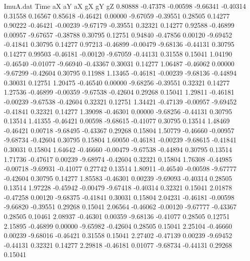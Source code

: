 \begin{filecontents}{ImuA.dat}
Time aX aY aX gX gY gZ
   0.80888   -0.47378   -0.00598   -9.66341   -0.40314    0.31558    0.16567
   0.85618   -0.46421    0.00000   -9.67059   -0.39551    0.28505    0.14277
   0.90222   -0.46421   -0.00239   -9.67179   -0.39551    0.32321    0.14277
   0.92588   -0.46899    0.00957   -9.67657   -0.38788    0.30795    0.12751
   0.94840   -0.47856    0.00120   -9.69452   -0.41841    0.30795    0.14277
   0.97213   -0.46899   -0.00479   -9.68136   -0.44131    0.30795    0.14277
   0.99503   -0.46181   -0.00120   -9.67059   -0.44131    0.31558    0.15041
   1.04190   -0.46540   -0.01077   -9.66940   -0.43367    0.30031    0.14277
   1.06487   -0.46062    0.00000   -9.67299   -0.42604    0.30795    0.11988
   1.13465   -0.46181   -0.00239   -9.68136   -0.44894    0.30031    0.12751
   1.20475   -0.46540    0.00000   -9.68256   -0.39551    0.32321    0.14277
   1.27536   -0.46899   -0.00359   -9.67538   -0.42604    0.29268    0.15041
   1.29811   -0.46181   -0.00239   -9.67538   -0.42604    0.32321    0.12751
   1.34421   -0.47139   -0.00957   -9.69452   -0.41841    0.32321    0.14277
   1.39098   -0.46301    0.00000   -9.68256   -0.44131    0.30795    0.13514
   1.41355   -0.46421    0.00598   -9.68615   -0.41077    0.30795    0.13514
   1.48469   -0.46421    0.00718   -9.68495   -0.43367    0.29268    0.15804
   1.50779   -0.46660   -0.00957   -9.68734   -0.42604    0.30795    0.15804
   1.60050   -0.46181   -0.00239   -9.68615   -0.41841    0.30031    0.15804
   1.64642   -0.46660   -0.00479   -9.67538   -0.44894    0.30795    0.13514
   1.71736   -0.47617    0.00239   -9.68974   -0.42604    0.32321    0.15804
   1.76308   -0.44985   -0.00718   -9.69931   -0.41077    0.27742    0.13514
   1.80911   -0.46540   -0.00598   -9.67777   -0.42604    0.30795    0.14277
   1.85583   -0.46301    0.00239   -9.69093   -0.40314    0.28505    0.13514
   1.97228   -0.45942   -0.00479   -9.67418   -0.40314    0.32321    0.15041
   2.01878   -0.47258    0.00120   -9.68375   -0.41841    0.30031    0.15804
   2.04231   -0.46181   -0.00598   -9.66820   -0.39551    0.29268    0.15041
   2.06564   -0.46062   -0.00120   -9.67777   -0.43367    0.28505    0.10461
   2.08937   -0.46301    0.00359   -9.68136   -0.41077    0.28505    0.12751
   2.15895   -0.46899    0.00000   -9.65982   -0.42604    0.28505    0.15041
   2.25104   -0.46660    0.00239   -9.68016   -0.46421    0.31558    0.15041
   2.27402   -0.47139    0.00239   -9.69452   -0.44131    0.32321    0.14277
   2.29818   -0.46181    0.01077   -9.68734   -0.44131    0.29268    0.15041

\end{filecontents}
